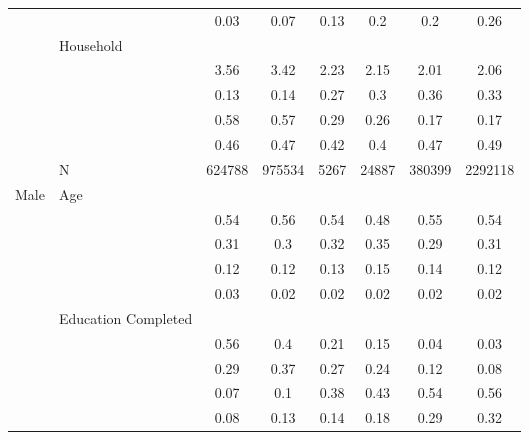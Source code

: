 \documentclass[
]{article}
\begin{document}
\begin{landscape}
\begin{table}[ht]
\begin{tabular}{l>{\raggedright\arraybackslash}p{3.2cm}|cccccc}
   & \multicolumn{1}{>{\raggedleft\arraybackslash}p{2cm}|}{\makebox[2cm][r]{University }} & 0.03 & 0.07 & 0.13 & 0.2 & 0.2 & 0.26 \\ 
   & Household &  &  &  &  &  &  \\ 
   & \multicolumn{1}{>{\raggedleft\arraybackslash}p{2.7cm}|}{\makebox[2.7cm][r]{Household Size }} & 3.56 & 3.42 & 2.23 & 2.15 & 2.01 & 2.06 \\ 
   & \multicolumn{1}{>{\raggedleft\arraybackslash}p{2.2cm}|}{\makebox[2.2cm][r]{Lives Alone }} & 0.13 & 0.14 & 0.27 & 0.3 & 0.36 & 0.33 \\ 
   & \multicolumn{1}{>{\raggedleft\arraybackslash}p{2.9cm}|}{\makebox[2.9cm][r]{Lives with Child }} & 0.58 & 0.57 & 0.29 & 0.26 & 0.17 & 0.17 \\ 
   & \multicolumn{1}{>{\raggedleft\arraybackslash}p{3.4cm}|}{\makebox[3.4cm][r]{Married/Cohabiting }} & 0.46 & 0.47 & 0.42 & 0.4 & 0.47 & 0.49 \\ 
   & N & 624788 & 975534 & 5267 & 24887 & 380399 & 2292118 \\ 
  Male & Age &  &  &  &  &  &  \\ 
   & \multicolumn{1}{>{\raggedleft\arraybackslash}p{1.5cm}|}{\makebox[1.5cm][r]{60 - 69 }} & 0.54 & 0.56 & 0.54 & 0.48 & 0.55 & 0.54 \\ 
   & \multicolumn{1}{>{\raggedleft\arraybackslash}p{1.5cm}|}{\makebox[1.5cm][r]{70 - 79 }} & 0.31 & 0.3 & 0.32 & 0.35 & 0.29 & 0.31 \\ 
   & \multicolumn{1}{>{\raggedleft\arraybackslash}p{1.5cm}|}{\makebox[1.5cm][r]{80 - 89 }} & 0.12 & 0.12 & 0.13 & 0.15 & 0.14 & 0.12 \\ 
   & \multicolumn{1}{>{\raggedleft\arraybackslash}p{1.5cm}|}{\makebox[1.5cm][r]{90 plus }} & 0.03 & 0.02 & 0.02 & 0.02 & 0.02 & 0.02 \\ 
   & Education Completed &  &  &  &  &  &  \\ 
   & \multicolumn{1}{>{\raggedleft\arraybackslash}p{3.2cm}|}{\makebox[3.2cm][r]{Less than Primary }} & 0.56 & 0.4 & 0.21 & 0.15 & 0.04 & 0.03 \\ 
   & \multicolumn{1}{>{\raggedleft\arraybackslash}p{1.7cm}|}{\makebox[1.7cm][r]{Primary }} & 0.29 & 0.37 & 0.27 & 0.24 & 0.12 & 0.08 \\ 
   & \multicolumn{1}{>{\raggedleft\arraybackslash}p{2cm}|}{\makebox[2cm][r]{Secondary }} & 0.07 & 0.1 & 0.38 & 0.43 & 0.54 & 0.56 \\ 
   & \multicolumn{1}{>{\raggedleft\arraybackslash}p{2cm}|}{\makebox[2cm][r]{University }} & 0.08 & 0.13 & 0.14 & 0.18 & 0.29 & 0.32 \\ 

\end{tabular}
\end{table}
\end{landscape}
\end{document}
